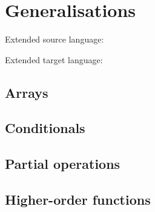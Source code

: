 \section{Generalisations}

Extended source language:





Extended target language:





\subsection{Arrays}

\subsection{Conditionals} 

\subsection{Partial operations} 

\subsection{Higher-order functions}
